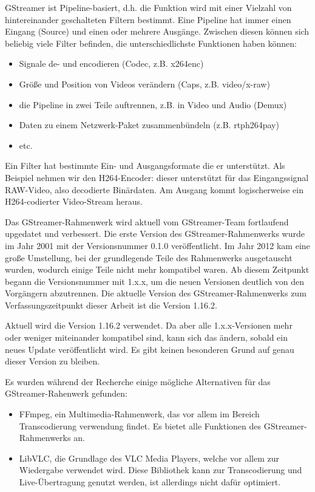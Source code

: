 GStreamer ist Pipeline-basiert, d.h. die Funktion wird mit einer Vielzahl von hintereinander geschalteten Filtern bestimmt.
Eine Pipeline hat immer einen Eingang (Source) und einen oder mehrere Ausgänge.
Zwischen diesen können sich beliebig viele Filter befinden, die unterschiedlichste Funktionen haben können:
\begin{itemize}
    \item Signale de- und encodieren (Codec, z.B. x264enc)
    \item Größe und Position von Videos verändern (Caps, z.B. video/x-raw)
    \item die Pipeline in zwei Teile auftrennen, z.B. in Video und Audio (Demux)
    \item Daten zu einem Netzwerk-Paket zusammenbündeln (z.B. rtph264pay)
    \item etc.
\end{itemize}
Ein Filter hat bestimmte Ein- und Ausgangsformate die er unterstützt.
Als Beispiel nehmen wir den H264-Encoder:
dieser unterstützt für das Eingangssignal RAW-Video, also decodierte Binärdaten. Am Ausgang kommt logischerweise ein H264-codierter Video-Stream heraus.\par

Das GStreamer-Rahmenwerk wird aktuell vom GStreamer-Team fortlaufend upgedatet und verbessert.
Die erste Version des GStreamer-Rahmenwerks wurde im Jahr 2001 mit der Versionsnummer 0.1.0 veröffentlicht.
Im Jahr 2012 kam eine große Umstellung, bei der grundlegende Teile des Rahmenwerks ausgetauscht wurden, wodurch einige Teile nicht mehr kompatibel waren.
Ab diesem Zeitpunkt begann die Versionsnummer mit 1.x.x, um die neuen Versionen deutlich von den Vorgängern abzutrennen.
Die aktuelle Version des GStreamer-Rahmenwerks zum Verfassungszeitpunkt dieser Arbeit ist die Version 1.16.2.\par

Aktuell wird die Version 1.16.2 verwendet. Da aber alle 1.x.x-Versionen mehr oder weniger miteinander kompatibel sind, kann sich das ändern, sobald ein neues Update veröffentlicht wird. Es gibt keinen besonderen Grund auf genau dieser Version zu bleiben.\par

Es wurden während der Recherche einige mögliche Alternativen für das GStreamer-Rahenwerk gefunden:
\begin{itemize}
    \item FFmpeg, ein Multimedia-Rahmenwerk, das vor allem im Bereich Transcodierung verwendung findet. Es bietet alle Funktionen des GStreamer-Rahmenwerks an.
    \item LibVLC, die Grundlage des VLC Media Players, welche vor allem zur Wiedergabe verwendet wird. Diese Bibliothek kann zur Transcodierung und Live-Übertragung genutzt werden, ist allerdings nicht dafür optimiert.
\end{itemize}


